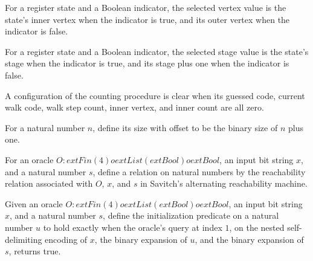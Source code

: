 \begin{definition}
\label{Complexity.LogProg.ISCount.St.wt}
\leanok
{}
For a register state and a Boolean indicator, the selected vertex value is the state's
inner vertex when the indicator is true, and its outer vertex when the indicator is
false.
\end{definition}

\begin{definition}
\label{Complexity.LogProg.ISCount.St.wb}
\leanok
{}
For a register state and a Boolean indicator, the selected stage value is the state's
stage when the indicator is true, and its stage plus one when the indicator is false.
\end{definition}

\begin{definition}
\label{Complexity.LogProg.ISCount.St.Clear}
\leanok
{}
A configuration of the counting procedure is clear when its guessed code, current walk
code, walk step count, inner vertex, and inner count are all zero.
\end{definition}

\begin{definition}
\label{Complexity.LogProg.ISCount.lgv}
\leanok
For a natural number $n$, define its size with offset to be the binary size of $n$ plus
one.
\end{definition}

\begin{definition}
\label{Complexity.LogProg.ISCount.RelO}
\leanok
{}
For an oracle $O:	ext{Fin}(4)	o	ext{List}(	ext{Bool})	o	ext{Bool}$, an input bit string
$x$, and a natural number $s$, define a relation on natural numbers by the reachability
relation associated with $O$, $x$, and $s$ in Savitch's alternating reachability
machine.
\end{definition}

\begin{definition}
\label{Complexity.LogProg.ISCount.InitO}
\leanok
{}
Given an oracle $O:	ext{Fin}(4)	o	ext{List}(	ext{Bool})	o	ext{Bool}$, an input bit
string $x$, and a natural number $s$, define the initialization predicate on a natural
number $u$ to hold exactly when the oracle's query at index $1$, on the nested
self-delimiting encoding of $x$, the binary expansion of $u$, and the binary expansion
of $s$, returns true.
\end{definition}

